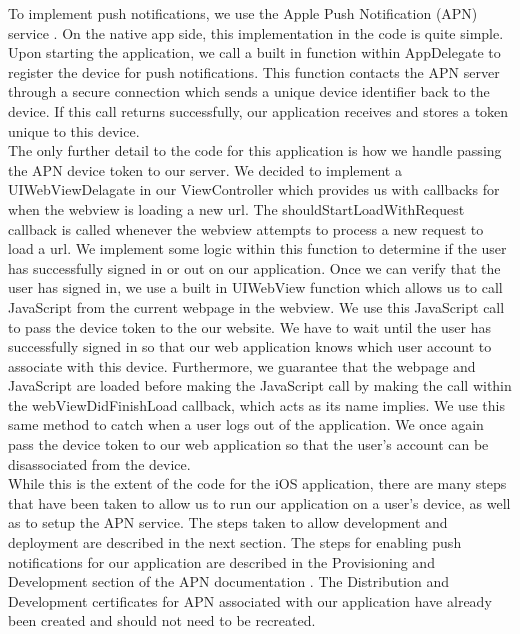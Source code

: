 \documentclass[12pt,letterpaper,titlepage]{article}
\begin{document}
To implement push notifications, we use the Apple Push Notification (APN) service \cite{apn}. On the native app side, this implementation in the code is quite simple. Upon starting the application, we call a built in function within AppDelegate to register the device for push notifications. This function contacts the APN server through a secure connection which sends a unique device identifier back to the device. If this call returns successfully, our application receives and stores a token unique to this device.\\

The only further detail to the code for this application is how we handle passing the APN device token to our server. We decided to implement a UIWebViewDelagate \cite{apple webview delegate} in our ViewController which provides us with callbacks for when the webview is loading a new url. The shouldStartLoadWithRequest callback is called whenever the webview attempts to process a new request to load a url. We implement some logic within this function to determine if the user has successfully signed in or out on our application. Once we can verify that the user has signed in, we use a built in UIWebView function which allows us to call JavaScript from the current webpage in the webview. We use this JavaScript call to pass the device token to the our website. We have to wait until the user has successfully signed in so that our web application knows which user account to associate with this device. Furthermore, we guarantee that the webpage and JavaScript are loaded before making the JavaScript call by making the call within the webViewDidFinishLoad callback, which acts as its name implies. We use this same method to catch when a user logs out of the application. We once again pass the device token to our web application so that the user's account can be disassociated from the device.\\

While this is the extent of the code for the iOS application, there are many steps that have been taken to allow us to run our application on a user's device, as well as to setup the APN service. The steps taken to allow development and deployment are described in the next section. The steps for enabling push notifications for our application are described in the Provisioning and Development section of the APN documentation \cite{apn}. The Distribution and Development certificates for APN associated with our application have already been created and should not need to be recreated. 
\end{document}
